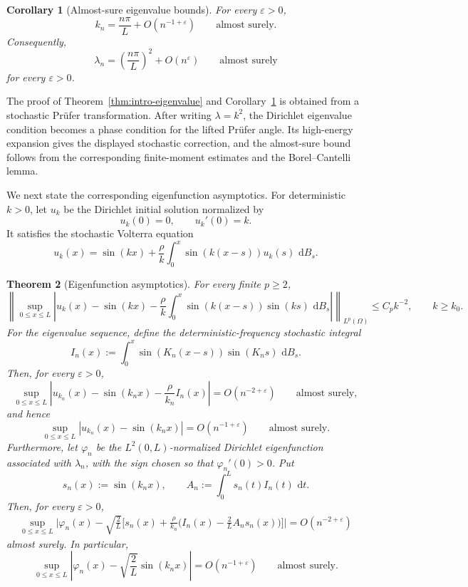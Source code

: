 \documentclass[11pt]{article}
\newtheorem{theorem}{Theorem}[section]
\newtheorem{corollary}[theorem]{Corollary}
\newcommand{\dd}{\,\mathrm d}
\begin{document}
\begin{corollary}[Almost-sure eigenvalue bounds]\label{cor:intro-eigenvalue-as}
For every $\varepsilon>0$,
\[
    k_n=\frac{n\pi}{L}+O(n^{-1+\varepsilon})
    \qquad\text{almost surely}.
\]
Consequently,
\[
    \lambda_n=\left(\frac{n\pi}{L}\right)^2+O(n^\varepsilon)
    \qquad\text{almost surely}
\]
for every $\varepsilon>0$.
\end{corollary}

The proof of Theorem~\ref{thm:intro-eigenvalue} and Corollary~\ref{cor:intro-eigenvalue-as} is obtained from a stochastic Pr\"ufer transformation. After writing $\lambda=k^2$, the Dirichlet eigenvalue condition becomes a phase condition for the lifted Pr\"ufer angle. Its high-energy expansion gives the displayed stochastic correction, and the almost-sure bound follows from the corresponding finite-moment estimates and the Borel--Cantelli lemma.

We next state the corresponding eigenfunction asymptotics. For deterministic $k>0$, let $u_k$ be the Dirichlet initial solution normalized by
\[
    u_k(0)=0,\qquad u_k'(0)=k.
\]
It satisfies the stochastic Volterra equation
\[
    u_k(x)=\sin(kx)+\frac{\rho}{k}
    \int_0^x \sin(k(x-s))u_k(s)\,\dd B_s.
\]

\begin{theorem}[Eigenfunction asymptotics]\label{thm:intro-eigenfunction}
For every finite $p\ge2$,
\[
\left\|
    \sup_{0\le x\le L}\left|
    u_k(x)-\sin(kx)
    -\frac{\rho}{k}
    \int_0^x\sin(k(x-s))\sin(ks)\,\dd B_s
    \right|
\right\|_{L^p(\Omega)}
    \le C_p k^{-2},
    \qquad k\ge k_0.
\]
For the eigenvalue sequence, define the deterministic-frequency stochastic integral
\[
    I_n(x):=\int_0^x
    \sin\left(K_n(x-s)\right)\sin(K_ns)\,\dd B_s.
\]
Then, for every $\varepsilon>0$,
\[
    \sup_{0\le x\le L}
    \left|u_{k_n}(x)-\sin(k_nx)-\frac{\rho}{k_n}I_n(x)\right|
    =O(n^{-2+\varepsilon})
    \qquad\text{almost surely},
\]
and hence
\[
    \sup_{0\le x\le L}|u_{k_n}(x)-\sin(k_nx)|
    =O(n^{-1+\varepsilon})
    \qquad\text{almost surely}.
\]
Furthermore, let $\varphi_n$ be the $L^2(0,L)$-normalized Dirichlet eigenfunction associated with $\lambda_n$, with the sign chosen so that $\varphi_n'(0)>0$. Put
\[
    s_n(x):=\sin(k_nx),
    \qquad
    A_n:=\int_0^L s_n(t)I_n(t)\,\dd t.
\]
Then, for every $\varepsilon>0$,
\[
\begin{aligned}
    \sup_{0\le x\le L}\Bigg|
    \varphi_n(x)-\sqrt{\frac{2}{L}}
    \bigg[
    s_n(x)+\frac{\rho}{k_n}
    \bigg(I_n(x)-\frac{2}{L}A_ns_n(x)\bigg)
    \bigg]\Bigg|
    =O(n^{-2+\varepsilon})
\end{aligned}
\]
almost surely. In particular,
\[
    \sup_{0\le x\le L}
    \left|\varphi_n(x)-\sqrt{\frac{2}{L}}\sin(k_nx)\right|
    =O(n^{-1+\varepsilon})
    \qquad\text{almost surely}.
\]
\end{theorem}
\end{document}
